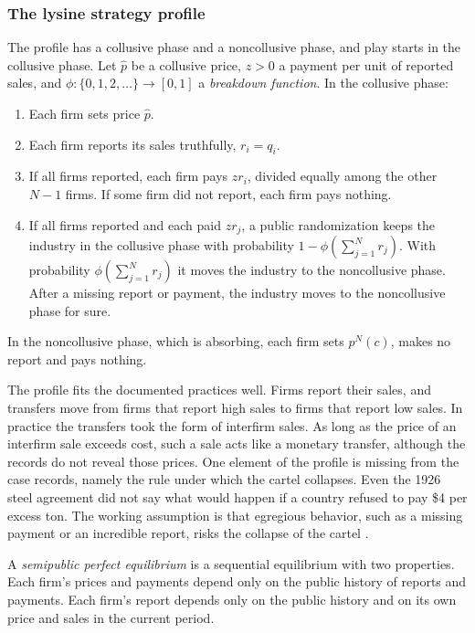 \subsubsection{The lysine strategy profile}

\begin{definition}\label{def:12-lysine}
The profile has a collusive phase and a noncollusive phase, and play starts in the collusive phase. Let $\hat p$
be a collusive price, $z > 0$ a payment per unit of reported sales, and
$\phi: \{0, 1, 2, \dots\} \to [0,1]$ a \emph{breakdown function}. In the collusive phase:
\begin{enumerate}[label=(\alph*)]
\item Each firm sets price $\hat p$.
\item Each firm reports its sales truthfully, $r_i = q_i$.
\item If all firms reported, each firm pays $z r_i$, divided equally among the other $N - 1$ firms. If some firm
did not report, each firm pays nothing.
\item If all firms reported and each paid $z r_j$, a public randomization keeps the industry in the collusive
phase with probability $1 - \phi(\sum_{j=1}^{N} r_j)$. With probability $\phi(\sum_{j=1}^{N} r_j)$ it moves the
industry to the noncollusive phase. After a missing report or payment, the industry moves to the noncollusive
phase for sure.
\end{enumerate}
In the noncollusive phase, which is absorbing, each firm sets $p^N(c)$, makes no report and pays nothing.
\end{definition}

The profile fits the documented practices well. Firms report their sales, and transfers move from firms that
report high sales to firms that report low sales. In practice the transfers took the form of interfirm sales. As
long as the price of an interfirm sale exceeds cost, such a sale acts like a monetary transfer, although the
records do not reveal those prices. One element of the profile is missing from the case records, namely the rule
under which the cartel collapses. Even the 1926 steel agreement did not say what would happen if a country refused
to pay \$4 per excess ton. The working assumption is that egregious behavior, such as a missing payment or an
incredible report, risks the collapse of the cartel \citep[p.~2433]{HarringtonSkrzypacz2011}.

\begin{definition}\label{def:12-semipublic}
A \emph{semipublic perfect equilibrium} \citep{Compte1998} is a sequential equilibrium with two properties. Each
firm's prices and payments depend only on the public history of reports and payments. Each firm's report depends
only on the public history and on its own price and sales in the current period.
\end{definition}

